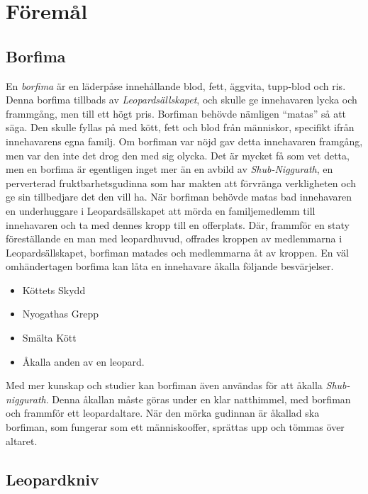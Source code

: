 \section{Föremål}
\subsection{Borfima}
\label{itm:Borrfima}
%
En \textit{borfima} är en läderpåse innehållande blod, fett, äggvita, tupp-blod och ris. Denna borfima tillbads av \textit{Leopardsällskapet}, och skulle ge innehavaren lycka och frammgång, men till ett högt pris. Borfiman behövde nämligen ``matas'' så att säga. Den skulle fyllas på med kött, fett och blod från människor, specifikt ifrån innehavarens egna familj. Om borfiman var nöjd gav detta innehavaren framgång, men var den inte det drog den med sig olycka. Det är mycket få som vet detta, men en borfima är egentligen inget mer än en avbild av \textit{Shub-Niggurath}, en perverterad fruktbarhetsgudinna som har makten att förvränga verkligheten och ge sin tillbedjare det den vill ha. När borfiman behövde matas bad innehavaren en underhuggare i Leopardsällskapet att mörda en familjemedlemm till innehavaren och ta med dennes kropp till en offerplats. Där, frammför en staty föreställande en man med leopardhuvud, offrades kroppen av medlemmarna i Leopardsällskapet, borfiman matades och medlemmarna åt av kroppen. En väl omhändertagen borfima kan låta en innehavare åkalla följande besvärjelser.
%
\begin{itemize}
	\item Köttets Skydd
	\item Nyogathas Grepp
	\item Smälta Kött
	\item Åkalla anden av en leopard.
\end{itemize}
%
Med mer kunskap och studier kan borfiman även användas för att åkalla \textit{Shub-niggurath}. Denna åkallan måste göras under en klar natthimmel, med borfiman och frammför ett leopardaltare. När den mörka gudinnan är åkallad ska borfiman, som fungerar som ett människooffer, sprättas upp och tömmas över altaret.

\subsection{Leopardkniv}
\label{itm:Leopardkniv}